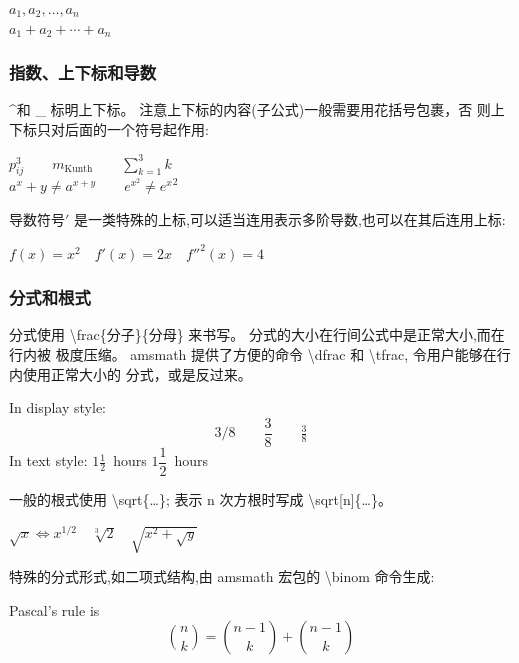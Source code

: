\documentclass[a4paper]{ctexart}
\begin{document}
    $a_1,a_2,\dots,a_n$\\
    $a_1 + a_2 + \cdots + a_n$\par
    \subsubsection{指数、上下标和导数}
    \textasciicircum 和 \_ 标明上下标。%
    注意上下标的内容(子公式)一般需要用花括号包裹，否 则上下标只对后面的一个符号起作用:\par
    $p^3_{ij} \qquad
     m_\mathrm{Kunth} \qquad
     \sum_{k=1}^3 k$\\
    $a^x +y \neq a^{x+y} \qquad
     e^{x^2} \neq {e^x}^2$ \par
    导数符号$'$ 是一类特殊的上标,可以适当连用表示多阶导数,也可以在其后连用上标:\par
    $f(x) = x^2 \quad
     f'(x) = 2x \quad
     f''^{2}(x) = 4$ \par
    \subsubsection{分式和根式}
    分式使用 \textbackslash frac\{分子\}\{分母\} 来书写。%
    分式的大小在行间公式中是正常大小,而在行内被 极度压缩。%
    amsmath 提供了方便的命令 \textbackslash dfrac 和 \textbackslash tfrac,%
    令用户能够在行内使用正常大小的 分式，或是反过来。\par
    In display style:
    \[
        3/8 \qquad
        \frac{3}{8} \qquad
        \tfrac{3}{8}
    \]
    In text style:
    $1\frac{1}{2}$~hours \qquad
    $1\dfrac{1}{2}$~hours\par
    一般的根式使用 \textbackslash sqrt\{\dots\};%
    表示 n 次方根时写成 \textbackslash sqrt[n]\{\dots\}。\par
    $\sqrt{x} \Leftrightarrow x^{1/2} \quad
     \sqrt[3]{2} \quad
     \sqrt{x^{2} + \sqrt{y}}$ \par
    特殊的分式形式,如二项式结构,由 amsmath 宏包的 \textbackslash binom 命令生成:\par
    Pascal's rule is
    \[
        \binom{n}{k} = \binom{n - 1}{k} + \binom{n - 1}{k}   
    \]
\end{document}
